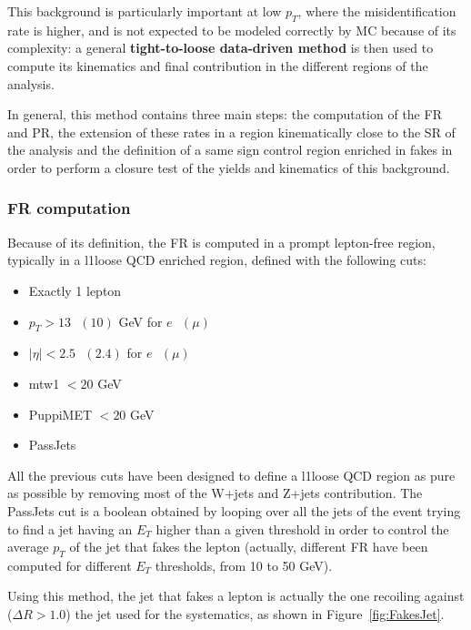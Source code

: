 \documentclass[a4paper, 10pt, openright]{report}
\begin{document}
This background is particularly important at low $p_T$, where the misidentification rate is higher, and is not expected to be modeled correctly by \ac{MC} because of its complexity: a general \textbf{tight-to-loose data-driven method} is then used to compute its kinematics and final contribution in the different regions of the analysis. 

In general, this method contains three main steps: the computation of the \ac{FR} and \ac{PR}, the extension of these rates in a region kinematically close to the \ac{SR} of the analysis and the definition of a same sign control region enriched in fakes in order to perform a closure test of the yields and kinematics of this background.%

\subsubsection*{\acf{FR} computation}

Because of its definition, the \ac{FR} is computed in a prompt lepton-free region, typically in a l1loose \ac{QCD} enriched region, defined with the following cuts:
\begin{multicols}{2}
\begin{itemize}
\item Exactly 1 lepton
\item $p_{T} > 13 \text{ } (10)$ GeV for $e \text{ }(\mu)$ 
\item $|\eta| < 2.5 \text{ } (2.4)$ for $e \text{ }(\mu)$ 
\item mtw1 $< 20$ GeV
\item PuppiMET $< 20$ GeV
\item PassJets
\end{itemize}
\end{multicols}

All the previous cuts have been designed to define a l1loose \ac{QCD} region as pure as possible by removing most of the W+jets and Z+jets contribution. The PassJets cut is a boolean obtained by looping over all the jets of the event trying to find a jet having an $E_T$ higher than a given threshold in order to control the average $p_T$ of the jet that fakes the lepton (actually, different \ac{FR} have been computed for different $E_T$ thresholds, from 10 to 50 GeV). 

Using this method, the jet that fakes a lepton is actually the one recoiling against ($\Delta R > 1.0$) the jet used for the systematics, as shown in Figure~\ref{fig:FakesJet}.
\end{document}
